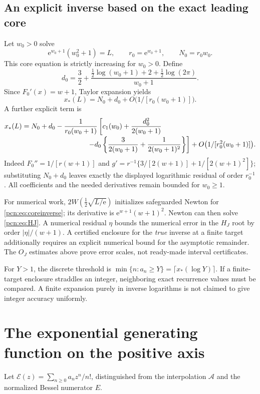 \documentclass[11pt,letterpaper]{article}
\theoremstyle{remark}\newtheorem{remark}[theorem]{Remark}
\newcommand{\ee}{\mathrm e}
\begin{document}
\subsection{An explicit inverse based on the exact leading core}
Let $w_0>0$ solve
\begin{equation}\label{pcn:eq:coreinverse}
 \ee^{w_0+1}(w_0^2+1)=L,\qquad r_0=\ee^{w_0+1},\qquad N_0=r_0w_0.
\end{equation}
This core equation is strictly increasing for $w_0>0$. Define
\begin{equation}\label{pcn:eq:d0}
 d_0=\frac32+
 \frac{\tfrac12\log(w_0+1)+2+\tfrac12\log(2\pi)}{w_0+1}.
\end{equation}
Since $F_0'(x)=w+1$, Taylor expansion yields
\begin{equation}\label{pcn:eq:inversefirst}
 x_*(L)=N_0+d_0+O\bigl(1/[r_0(w_0+1)]\bigr).
\end{equation}
A further explicit term is
\begin{align}\label{pcn:eq:inversesecond}
 x_*(L)={}&N_0+d_0-\frac{1}{r_0(w_0+1)}
 \left[c_1(w_0)+\frac{d_0^2}{2(w_0+1)}\right.\notag\\[-2pt]
 &\left.\hspace{28mm}-d_0\left\{\frac{3}{2(w_0+1)}
                              +\frac{1}{2(w_0+1)^2}\right\}\right]
 +O\bigl(1/[r_0^2(w_0+1)]\bigr).
\end{align}
Indeed $F_0''=1/[r(w+1)]$ and
$g'=r^{-1}\{3/[2(w+1)]+1/[2(w+1)^2]\}$; substituting $N_0+d_0$ leaves exactly the displayed logarithmic residual of order $r_0^{-1}$. All coefficients and the needed derivatives remain bounded for $w_0\ge1$.

For numerical work, $2W(\tfrac12\sqrt{L/\ee})$ initializes safeguarded Newton for \eqref{pcn:eq:coreinverse}; its derivative is $\ee^{w+1}(w+1)^2$. Newton can then solve \eqref{pcn:eq:HJ}. A numerical residual $\eta$ bounds the numerical error in the $H_J$ root by order $|\eta|/(w+1)$. A certified enclosure for the \emph{true} inverse at a finite target additionally requires an explicit numerical bound for the asymptotic remainder. The $O_J$ estimates above prove error scales, not ready-made interval certificates.

For $Y>1$, the discrete threshold is $\min\{n:a_n\ge Y\}=\lceil x_*(\log Y)\rceil$. If a finite-target enclosure straddles an integer, neighboring exact recurrence values must be compared. A finite expansion purely in inverse logarithms is not claimed to give integer accuracy uniformly.

\section{The exponential generating function on the positive axis}
Let $\mathcal E(z)=\sum_{n\ge0}a_nz^n/n!$, distinguished from the interpolation $\mathcal A$ and the normalized Bessel numerator $E$.
\end{document}
